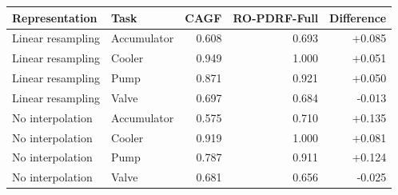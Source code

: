 \begin{tabular}{llrrr}
\toprule
Representation & Task & CAGF & RO-PDRF-Full & Difference \\
\midrule
Linear resampling & Accumulator & 0.608 & 0.693 & +0.085 \\
Linear resampling & Cooler & 0.949 & 1.000 & +0.051 \\
Linear resampling & Pump & 0.871 & 0.921 & +0.050 \\
Linear resampling & Valve & 0.697 & 0.684 & -0.013 \\
No interpolation & Accumulator & 0.575 & 0.710 & +0.135 \\
No interpolation & Cooler & 0.919 & 1.000 & +0.081 \\
No interpolation & Pump & 0.787 & 0.911 & +0.124 \\
No interpolation & Valve & 0.681 & 0.656 & -0.025 \\
\bottomrule
\end{tabular}